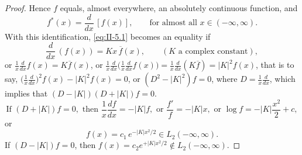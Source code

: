 \begin{proof}
Hence $f$ equals, almost everywhere, an absolutely continuous function, and
\begin{equation}\tag{5.14}\label{eq:II-5.14}
f^{*}(x)=\frac{d}{dx}\,[f(x)],\qquad\text{for almost all }x\in(-\infty,\infty).
\end{equation}
With this identification, \eqref{eq:II-5.1} becomes an equality if
\[
\frac{d}{dx}\,(f(x))=K x\,\overline{f}(x),\qquad(K\text{ a complex constant}),
\]
or $\frac{1}{x}\frac{d}{dx}f(x)=K\overline{f}(x)$, or $\frac{1}{x}\frac{d}{dx}\bigl(\frac{1}{x}\frac{d}{dx}f(x)\bigr)=\frac{1}{x}\frac{d}{dx}(K\overline{f})=|K|^{2}f(x)$, that is to say, $\bigl(\frac{1}{x}\frac{d}{dx}\bigr)^{2}f(x)-|K|^{2}f(x)=0$, or $(D^{2}-|K|^{2})f=0$, where $D=\frac{1}{x}\frac{d}{dx}$, which implies that $(D-|K|)(D+|K|)f=0$.
\[
\text{If }(D+|K|)f=0,\text{ then }\frac{1}{x}\frac{df}{dx}=-|K|f,\text{ or }\frac{f'}{f}=-|K|x,\text{ or }\log f=-|K|\frac{x^{2}}{2}+c,
\]
or
\begin{equation}\tag{5.15}\label{eq:II-5.15}
f(x)=c_{1}\,e^{-|K|x^{2}/2}\in L_{2}(-\infty,\infty).
\end{equation}
If $(D-|K|)f=0$, then $f(x)=c_{2}e^{+|K|x^{2}/2}\notin L_{2}(-\infty,\infty)$.


\end{proof}
